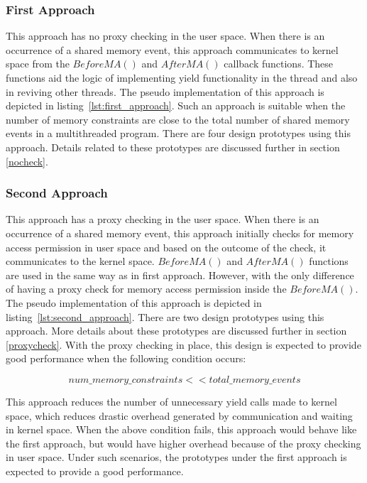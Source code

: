 \subsubsection{First Approach \label{fir_app}}

This approach has no proxy checking in the user space. 
When there is an occurrence of a shared memory event, this approach communicates to kernel space from the $BeforeMA()$ and $AfterMA()$ callback functions. 
These functions aid the logic of implementing yield functionality in the thread and also in reviving other threads. 
The pseudo implementation of this approach is depicted in listing~\ref{lst:first_approach}. 
Such an approach is suitable when the number of memory constraints are close to the total number of shared memory events in a multithreaded program. 
There are four design prototypes using this approach. 
Details related to these prototypes are discussed further in section \ref{nocheck}.

\subsubsection{Second Approach \label{sec_app}}

This approach has a proxy checking in the user space. 
When there is an occurrence of a shared memory event, this approach initially checks for memory access permission in user space and based on the outcome of the check, it communicates to the kernel space. 
$BeforeMA()$ and $AfterMA()$ functions are used in the same way as in first approach. 
However, with the only difference of having a proxy check for memory access permission inside the $BeforeMA()$. 
The pseudo implementation of this approach is depicted in listing~\ref{lst:second_approach}.
There are two design prototypes using this approach. More details about these prototypes are discussed further in section \ref{proxycheck}.
With the proxy checking in place, this design is expected to provide good performance when the following condition occurs: 

\begin{equation}
num\_memory\_constraints << total\_memory\_events
\label{mem_cond}
\end{equation}


This approach reduces the number of unnecessary yield calls made to kernel space, which reduces drastic overhead generated by communication and waiting in kernel space. 
When the above condition fails, this approach would behave like the first approach, but would have higher overhead because of the proxy checking in user space. 
Under such scenarios, the prototypes under the first approach is expected to provide a good performance. 


